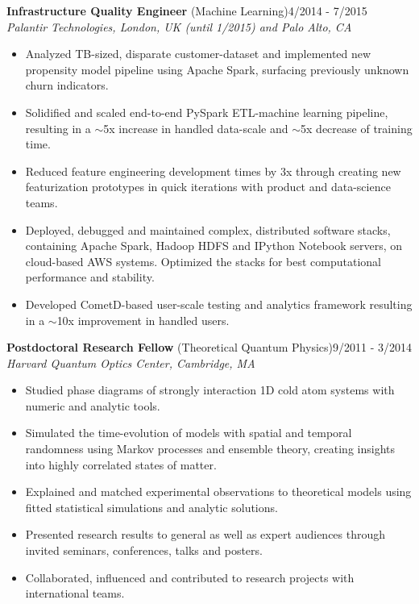 \documentclass[10pt,centered]{./res} %
\begin{document}
\begin{resume}
{\bf Infrastructure Quality Engineer} (Machine Learning)\hfill4/2014 - 7/2015 \\
{\it Palantir Technologies, London, UK (until 1/2015) and Palo Alto, CA}
\begin{itemize}
  \item Analyzed TB-sized, disparate customer-dataset and implemented new propensity model pipeline using Apache Spark, surfacing previously unknown churn indicators.
  \item Solidified and scaled end-to-end PySpark ETL-machine learning pipeline, resulting in a $\sim$5x increase in handled data-scale and $\sim$5x decrease of training time.
  \item Reduced feature engineering development times by 3x through creating new featurization prototypes in quick iterations with product and data-science teams.
  \item Deployed, debugged and maintained complex, distributed software stacks, containing Apache Spark, Hadoop HDFS and IPython Notebook servers, on cloud-based AWS systems. Optimized the stacks for best computational performance and stability.
  \item Developed CometD-based user-scale testing and analytics framework resulting in a $\sim$10x improvement in handled users.
\end{itemize}

{\bf Postdoctoral Research Fellow} (Theoretical Quantum Physics)\hfill 9/2011 - 3/2014 \\
{\it Harvard Quantum Optics Center, Cambridge, MA}
\begin{itemize}
  \item Studied phase diagrams of strongly interaction 1D cold atom systems with numeric and analytic tools.
  \item Simulated the time-evolution of models with spatial and temporal randomness using Markov processes and ensemble theory, creating insights into highly correlated states of matter.
  \item Explained and matched experimental observations to theoretical models using fitted statistical simulations and analytic solutions.
  \item Presented research results to general as well as expert audiences through invited seminars, conferences, talks and posters.
  \item Collaborated, influenced and contributed to research projects with international teams.
\end{itemize}


\end{resume}
\end{document}
